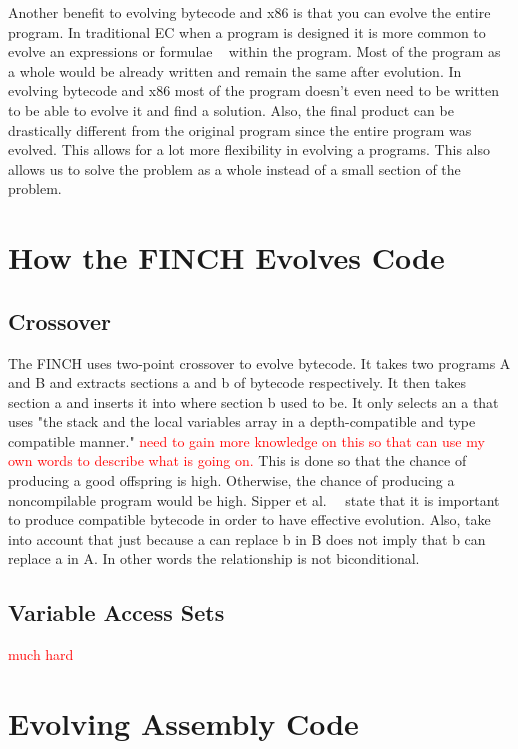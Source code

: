 \documentclass{sig-alternate}
\newcommand{\mycomment}[1]{\textcolor{red}{#1}}
\begin{document}
Another benefit to evolving bytecode and x86 is that you can evolve the entire program. In traditional EC when a program is designed it is more common to evolve an expressions or formulae ~\cite{FINCH:2010} within the program. Most of the program as a whole would be already written and remain the same after evolution. In evolving bytecode and x86 most of the program doesn't even need to be written to be able to evolve it and find a solution. Also, the final product can be drastically different from the original program since the entire program was evolved. This allows for a lot more flexibility in evolving a programs. This also allows us to solve the problem as a whole instead of a small section of the problem.


\section{How the FINCH Evolves Code}

\subsection{Crossover}
The FINCH uses two-point crossover to evolve bytecode. It takes two programs A and B and extracts sections a and b of bytecode respectively. It then takes section a and inserts it into where section b used to be. It only selects an a that uses "the stack and the local variables array in a depth-compatible and type compatible manner." \mycomment{need to gain more knowledge on this so that  can use my own words to describe what is going on.} This is done so that the chance of producing a good offspring is high. Otherwise, the chance of producing a noncompilable program would be high. Sipper et al.~\cite{FINCH:2010}~\cite{FINCH2:2009} state that it is important to produce compatible bytecode in order to have effective evolution. Also, take into account that just because a can replace b in B does not imply that b can replace a in A. In other words the relationship is not biconditional.

\subsection{Variable Access Sets}
\cite{FINCH2:2009} \mycomment{much hard}


\section{Evolving Assembly Code}
\end{document}
